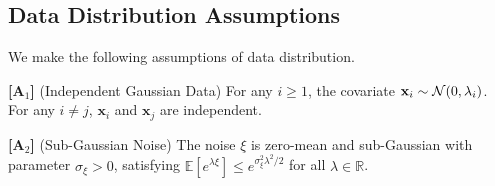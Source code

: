 \subsection{Data Distribution Assumptions}
We make the following assumptions of data distribution.
\begin{assumption}\label{ass-d}%
    \item[\textbf{[A$_\text{1}$]}] (Independent Gaussian Data) For any $i\ge 1$, the covariate $\mathbf{x}_i\sim\mathcal{N}(0,\lambda_i)$. For any $i\neq j$, $\mathbf{x}_i$ and $\mathbf{x}_j$ are independent.
    \item[\textbf{[A$_\text{2}$]}] (Sub-Gaussian Noise) The noise $\xi$ is zero-mean and sub-Gaussian with parameter $\sigma_\xi > 0$, satisfying $\mathbb{E}[e^{\lambda \xi}] \leq e^{\sigma_\xi^2 \lambda^2/2}$ for all $\lambda \in \mathbb{R}$.
\end{assumption}
